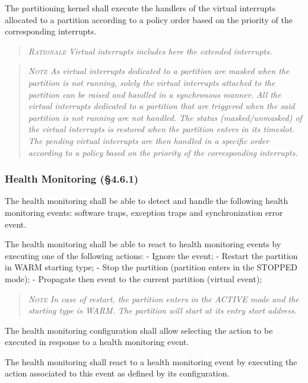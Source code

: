 The partitioning kernel shall execute the handlers of the virtual interrupts allocated to a partition according to a policy order based on the priority of the corresponding interrupts.
\begin{quote}\it
\textsc{Rationale}
Virtual interrupts includes here the extended interrupts.
\end{quote}
\begin{quote}\it
\textsc{Note}
As virtual interrupts dedicated to a partition are masked when the partition is not running, solely the virtual interrupts attached to the partition can be raised and handled in a synchronous manner. All the virtual interrupts dedicated to a partition that are triggered when the said partition is not running are not handled. The status (masked/unmasked) of the virtual interrupts is restored when the partition enters in its timeslot. The pending virtual interrupts are then handled in a specific order according to a policy based on the priority of the corresponding interrupts.
\end{quote}

\subsubsection{Health Monitoring (\S4.6.1)}

The health monitoring shall be able to detect and handle the following health monitoring events: software traps, exception traps and synchronization error event.

The health monitoring shall be able to react to health monitoring events by executing one of the following actions:
- Ignore the event;
- Restart the partition in WARM starting type;
- Stop the partition (partition enters in the STOPPED mode);
- Propagate then event to the current partition (virtual event);
\begin{quote}\it
\textsc{Note}
In case of restart, the partition enters in the ACTIVE mode and the starting type is WARM. The partition will start at its entry start address.
\end{quote}

The health monitoring configuration shall allow selecting the action to be executed in response to a health monitoring event.

The health monitoring shall react to a health monitoring event by executing the action associated to this event as defined by its configuration.

